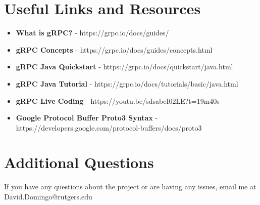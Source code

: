 \documentclass{article}
\begin{document}
\section{Useful Links and Resources} %
\begin{itemize}
\item \textbf{What is gRPC?} - https://grpc.io/docs/guides/
\item \textbf{gRPC Concepts} - https://grpc.io/docs/guides/concepts.html
\item \textbf{gRPC Java Quickstart} - https://grpc.io/docs/quickstart/java.html
\item \textbf{gRPC Java Tutorial} - https://grpc.io/docs/tutorials/basic/java.html
\item \textbf{gRPC Live Coding} - https://youtu.be/sdsabcI02LE?t=19m40s 
\item \textbf{Google Protocol Buffer Proto3 Syntax} - https://developers.google.com/protocol-buffers/docs/proto3
\end{itemize}



\section{Additional Questions} %
If you have any questions about the project or are having any issues, email me at David.Domingo@rutgers.edu


%
\end{document}
